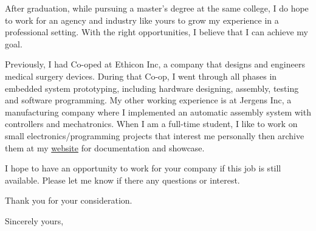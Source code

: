\documentclass[11pt]{letter} %
\begin{document}
\begin{letter}
After graduation, while pursuing a master’s degree at the same college, I do hope to work for an agency and industry like yours to grow my experience in a professional setting. With the right opportunities, I believe that I can achieve my goal.

Previously, I had Co-oped at Ethicon Inc, a company that designs and engineers medical surgery devices. During that Co-op, I went through all phases in embedded system prototyping, including hardware designing, assembly, testing and software programming. My other working experience is at Jergens Inc, a manufacturing company where I implemented an automatic assembly system with controllers and mechatronics. When I am a full-time student, I like to work on small electronics/programming projects that interest me personally then archive them at my \href{https://liu2z2.github.io/tags#project-ref}{website} for documentation and showcase. 

I hope to have an opportunity to work for your company if this job is still available. Please let me know if there any questions or interest. 

Thank you for your consideration.

\closing{Sincerely yours,}




\end{letter}
\end{document}
